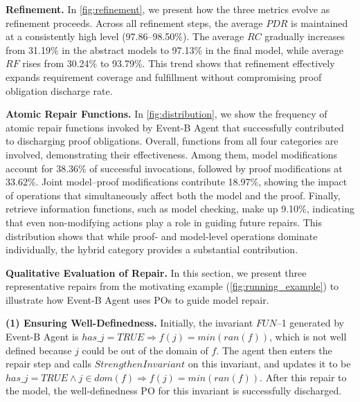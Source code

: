 



\noindent
\textbf{Refinement.}
In \autoref{fig:refinement}, we present how the three metrics evolve as refinement proceeds.
Across all refinement steps, the average $PDR$ is maintained at a consistently high level (97.86–98.50\%). 
The average $RC$ gradually increases from 31.19\% in the abstract models to 97.13\% in the final model, while average $RF$ rises from 30.24\% to 93.79\%.
This trend shows that refinement effectively expands requirement coverage and fulfillment without compromising proof obligation discharge rate.

\noindent
\textbf{Atomic Repair Functions.}
In \autoref{fig:distribution}, we show the frequency of atomic repair functions invoked by Event-B Agent that successfully contributed to discharging proof obligations.  
Overall, functions from all four categories are involved, demonstrating their effectiveness. 
Among them, model modifications account for 38.36\% of successful invocations, followed by proof modifications at 33.62\%. 
Joint model–proof modifications contribute 18.97\%, showing the impact of operations that simultaneously affect both the model and the proof. 
Finally, retrieve information functions, such as model checking, make up 9.10\%, indicating that even non-modifying actions play a role in guiding future repairs. 
This distribution shows that while proof- and model-level operations dominate individually, the hybrid category provides a substantial contribution.

\noindent
\textbf{Qualitative Evaluation of Repair.}
In this section, we present three representative repairs from the motivating example (\autoref{fig:running_example}) to illustrate how Event-B Agent uses POs to guide model repair.

\textbf{(1) Ensuring Well-Definedness.}
Initially, the invariant $FUN$--1 generated by Event-B Agent is $has\_j=TRUE \Rightarrow f(j)=min(ran(f))$, which is not well defined because $j$ could be out of the domain of $f$.
The agent then enters the repair step and calls $StrengthenInvariant$ on this invariant, and updates it to be $has\_j=TRUE \land j \in dom(f) \Rightarrow f(j)=min(ran(f))$.
After this repair to the model, the well-definedness PO for this invariant is successfully discharged.

